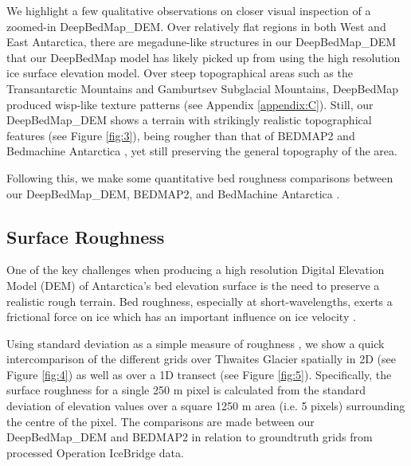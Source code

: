 \documentclass[tc, manuscript]{copernicus}
\begin{document}
We highlight a few qualitative observations on closer visual inspection of a zoomed-in DeepBedMap\_DEM.
Over relatively flat regions in both West and East Antarctica, there are megadune-like structures \citep{ScambosSnowMegadune2014} in our DeepBedMap\_DEM that our DeepBedMap model has likely picked up from using the high resolution ice surface elevation model.
Over steep topographical areas such as the Transantarctic Mountains and Gamburtsev Subglacial Mountains, DeepBedMap produced wisp-like texture patterns (see Appendix \ref{appendix:C}).
Still, our DeepBedMap\_DEM shows a terrain with strikingly realistic topographical features (see Figure \ref{fig:3}), being rougher than that of BEDMAP2 \citep{FretwellBedmap2improvedice2013} and Bedmachine Antarctica \citep{MorlighemMEaSUREsBedMachineAntarctica2019}, yet still preserving the general topography of the area.

Following this, we make some quantitative bed roughness comparisons between our DeepBedMap\_DEM, BEDMAP2, and BedMachine Antarctica \citep{MorlighemMEaSUREsBedMachineAntarctica2019}.

\subsection{Surface Roughness}

One of the key challenges when producing a high resolution Digital Elevation Model (DEM) of Antarctica's bed elevation surface is the need to preserve a realistic rough terrain.
Bed roughness, especially at short-wavelengths, exerts a frictional force on ice which has an important influence on ice velocity \citep{BinghamDiverselandscapesPine2017,FalciniQuantifyingbedroughness2018}.

Using standard deviation as a simple measure of roughness \citep{RippinBasalroughnessInstitute2014}, we show a quick intercomparison of the different grids over Thwaites Glacier spatially in 2D (see Figure \ref{fig:4}) as well as over a 1D transect (see Figure \ref{fig:5}).
Specifically, the surface roughness for a single 250 m pixel is calculated from the standard deviation of elevation values over a square 1250 m area (i.e. 5 pixels) surrounding the centre of the pixel.
The comparisons are made between our DeepBedMap\_DEM and BEDMAP2 in relation to groundtruth grids from processed Operation IceBridge data.
\end{document}
